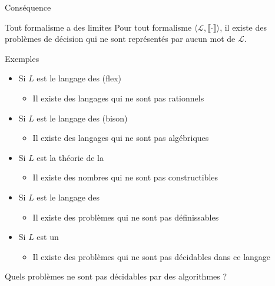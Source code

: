 
\begingroup

\begin{frame}{Conséquence}

  \begin{block}{Tout formalisme a des limites}
  Pour tout formalisme $\langle \mathcal{L}, \llbracket \cdot \rrbracket \rangle$, il existe des problèmes de décision qui ne sont représentés par aucun mot de $\mathcal{L}$.
  \end{block}
  
  \begin{exampleblock}{Exemples}
    \begin{itemize}
    \item Si $L$ est le langage des  (flex)
      \begin{itemize}
      \item Il existe des langages qui ne sont \alert{pas rationnels}
      \end{itemize}
    \item Si $L$ est le langage des  (bison)
      \begin{itemize}
      \item Il existe des langages qui ne sont \alert{pas algébriques}
      \end{itemize}
    \item Si $L$ est la théorie de la 
      \begin{itemize}
      \item Il existe des nombres qui ne sont \alert{pas constructibles}
      \end{itemize}
    \item Si $L$ est le langage des 
      \begin{itemize}
      \item Il existe des problèmes qui ne sont \alert{pas définissables}
      \end{itemize}
    \item Si $L$ est un 
      \begin{itemize}
      \item Il existe des problèmes qui ne sont \alert{pas décidables} dans ce langage
      \end{itemize}
    \end{itemize}
  \end{exampleblock}

  \begin{center}
    \alert{Quels problèmes ne sont pas décidables par des algorithmes ?}
  \end{center}

  
\end{frame}

\endgroup
\endinput
